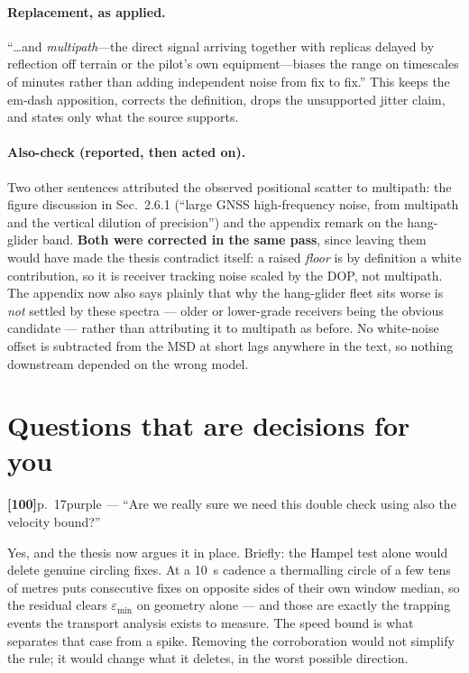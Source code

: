 \documentclass[11pt,a4paper]{article}
\newcommand{\ann}[3]{%
  \medskip\noindent\textbf{[#1]}\quad p.~#2\quad\textcolor{qcol}{\textsf{\small #3}}\par\nopagebreak}
\begin{document}
\paragraph{Replacement, as applied.}
\enquote{\dots and \emph{multipath}---the direct signal arriving together with replicas
delayed by reflection off terrain or the pilot's own equipment---biases the range on
timescales of minutes rather than adding independent noise from fix to fix.}
This keeps the em-dash apposition, corrects the definition, drops the unsupported jitter
claim, and states only what the source supports.

\paragraph{Also-check (reported, then acted on).} Two other sentences attributed the
observed positional scatter to multipath: the figure discussion in Sec.~2.6.1
(\enquote{large GNSS high-frequency noise, from multipath and the vertical dilution of
precision}) and the appendix remark on the hang-glider band. \textbf{Both were corrected in
the same pass}, since leaving them would have made the thesis contradict itself: a raised
\emph{floor} is by definition a white contribution, so it is receiver tracking noise scaled
by the DOP, not multipath. The appendix now also says plainly that why the hang-glider
fleet sits worse is \emph{not} settled by these spectra --- older or lower-grade receivers
being the obvious candidate --- rather than attributing it to multipath as before. No
white-noise offset is subtracted from the MSD at short lags anywhere in the text, so
nothing downstream depended on the wrong model.

\section{Questions that are decisions for you}

\ann{100}{17}{purple --- \enquote{Are we really sure we need this double check using also
the velocity bound?}}
Yes, and the thesis now argues it in place. Briefly: the Hampel test alone would delete
genuine circling fixes. At a \SI{10}{\second} cadence a thermalling circle of a few tens of
metres puts consecutive fixes on opposite sides of their own window median, so the residual
clears $\varepsilon_{\min}$ on geometry alone --- and those are exactly the trapping events
the transport analysis exists to measure. The speed bound is what separates that case from a
spike. Removing the corroboration would not simplify the rule; it would change what it
deletes, in the worst possible direction.
\end{document}
